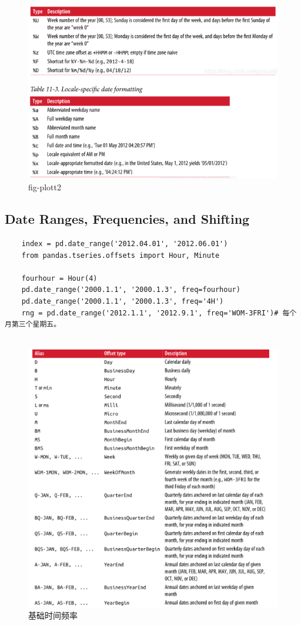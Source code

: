 \documentclass{article}
\begin{document}
\begin{figure}[htpb]
	\centering
	\includegraphics[width=\linewidth]{fig/t2}
	\caption{fig-plott2}
	\label{fig-shilit2}
\end{figure}


\subsection{Date Ranges, Frequencies, and Shifting}
\begin{lstlisting}
	index = pd.date_range('2012.04.01', '2012.06.01')
	from pandas.tseries.offsets import Hour, Minute
	
	fourhour = Hour(4)
	pd.date_range('2000.1.1', '2000.1.3', freq=fourhour)
	pd.date_range('2000.1.1', '2000.1.3', freq='4H')
	rng = pd.date_range('2012.1.1', '2012.9.1', freq='WOM-3FRI')# 每个月第三个星期五。
	
\end{lstlisting}
\begin{figure}[tbhp]
	\centering	
		\includegraphics[width=\linewidth]{fig/t3}
		\caption{基础时间频率}
		\label{fig-timefreq}
\end{figure}
\end{document}
